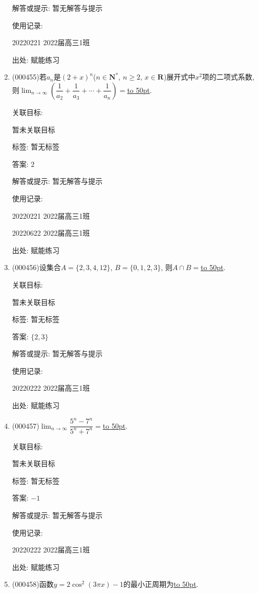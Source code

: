 \documentclass[10pt,a4paper]{article}
\newcommand{\blank}[1]{\underline{\hbox to #1pt{}}}
\begin{document}
\begin{enumerate}[1.]
解答或提示: 暂无解答与提示

使用记录:

20220221	2022届高三1班	


出处: 赋能练习
\item { (000455)}若$a_n$是$(2+x)^n$($n\in \mathbf{N}^*$, $n\ge 2$, $x\in \mathbf{R}$)展开式中$x^2$项的二项式系数, 则$\displaystyle\lim_{n\to\infty}(\dfrac 1{a_2}+\dfrac 1{a_3}+\cdots+\dfrac1{a_n})=$\blank{50}.


关联目标:

暂未关联目标



标签: 暂无标签

答案: $2$

解答或提示: 暂无解答与提示

使用记录:

20220221	2022届高三1班	

20220622	2022届高三1班  	


出处: 赋能练习
\item { (000456)}设集合$A=\{2,3,4,12\}$, $B=\{0,1,2,3\}$, 则$A\cap B=$\blank{50}.


关联目标:

暂未关联目标



标签: 暂无标签

答案: $\{2,3\}$

解答或提示: 暂无解答与提示

使用记录:

20220222	2022届高三1班	


出处: 赋能练习
\item { (000457)}$\displaystyle\lim_{n\to\infty}\dfrac{5^n-7^n}{5^n+7^n}=$\blank{50}.


关联目标:

暂未关联目标



标签: 暂无标签

答案: $-1$

解答或提示: 暂无解答与提示

使用记录:

20220222	2022届高三1班	


出处: 赋能练习
\item { (000458)}函数$y=2\cos^2(3\pi x)-1$的最小正周期为\blank{50}.



\end{enumerate}
\end{document}

